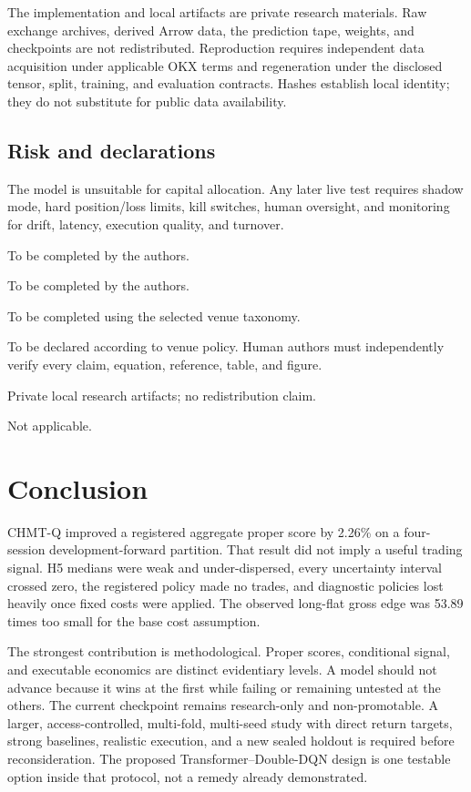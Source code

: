 \documentclass[10pt,letterpaper]{article}
\numberwithin{equation}{section}
\theoremstyle{definition}
\theoremstyle{remark}
\begin{document}
The implementation and local artifacts are private research materials. Raw
exchange archives, derived Arrow data, the prediction tape, weights, and
checkpoints are not redistributed. Reproduction requires independent data
acquisition under applicable OKX terms and regeneration under the disclosed
tensor, split, training, and evaluation contracts. Hashes establish local
identity; they do not substitute for public data availability.

\subsection{Risk and declarations}

The model is unsuitable for capital allocation. Any later live test requires
shadow mode, hard position/loss limits, kill switches, human oversight, and
monitoring for drift, latency, execution quality, and turnover.

\begin{description}[leftmargin=3.6cm,style=nextline]
\item[Funding] To be completed by the authors.
\item[Competing interests] To be completed by the authors.
\item[Author contributions] To be completed using the selected venue taxonomy.
\item[Generative tools] To be declared according to venue policy. Human authors
must independently verify every claim, equation, reference, table, and figure.
\item[Data and code] Private local research artifacts; no redistribution claim.
\item[Human or animal participants] Not applicable.
\end{description}

\section{Conclusion}

CHMT-Q improved a registered aggregate proper score by 2.26\% on a four-session
development-forward partition. That result did not imply a useful trading
signal. H5 medians were weak and under-dispersed, every uncertainty interval
crossed zero, the registered policy made no trades, and diagnostic policies
lost heavily once fixed costs were applied. The observed long-flat gross edge
was 53.89 times too small for the base cost assumption.

The strongest contribution is methodological. Proper scores, conditional
signal, and executable economics are distinct evidentiary levels. A model
should not advance because it wins at the first while failing or remaining
untested at the others. The current checkpoint remains research-only and
non-promotable. A larger, access-controlled, multi-fold, multi-seed study with
direct return targets, strong baselines, realistic execution, and a new sealed
holdout is required before reconsideration. The proposed
Transformer--Double-DQN design is one testable option inside that protocol, not
a remedy already demonstrated.
\end{document}
